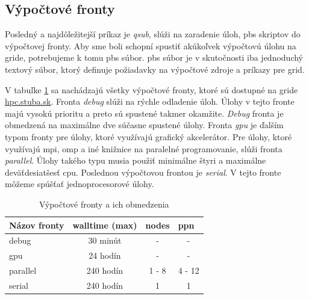 \subsection{Výpočtové fronty}
Posledný a najdôležitejší príkaz je \textit{qsub}, slúži na zaradenie úloh, \acrshort{pbs} skriptov do výpočtovej fronty.
Aby sme boli schopní spustiť akúkoľvek výpočtovú úlohu na gride, potrebujeme k tomu \acrfull{pbs} súbor.
\acrshort{pbs} súbor je v skutočnosti iba jednoduchý textový súbor, ktorý definuje požiadavky na výpočtové zdroje a príkazy pre grid.

V tabuľke \ref{tab:fronty} sa nachádzajú všetky výpočtové fronty, ktoré sú dostupné na gride \url{hpc.stuba.sk}.
Fronta \textit{debug} slúži na rýchle odladenie úloh. Úlohy v tejto fronte majú vysokú prioritu a preto sú spustené takmer okamžite.
\textit{Debug} fronta je obmedzená na maximálne dve súčasne spustené úlohy. Fronta \textit{gpu} je ďalším typom fronty pre úlohy, ktoré využívajú grafický akcelerátor.
Pre úlohy, ktoré využívajú \acrshort{mpi}, \acrshort{omp} a iné knižnice na paralelné programovanie, slúži fronta \textit{parallel}.
Úlohy takého typu musia použiť minimálne štyri a maximálne deväťdesiatšesť \acrshort{cpu}.
Poslednou výpočtovou frontou je \textit{serial}. V tejto fronte môžeme spúšťať jednoprocesorové úlohy. 

\begin{table}[!h]
\centering
\begin{tabular}{@{}lccc@{}}
\toprule
\textbf{Názov fronty} & \multicolumn{1}{l}{\textbf{walltime (max)}} & \multicolumn{1}{l}{\textbf{nodes}} & \multicolumn{1}{l}{\textbf{ppn}} \\ \midrule
debug                 & 30 minút                                    & -                                  & -                                      \\
gpu                   & 24 hodín                                    & -                                  & -                                      \\
parallel              & 240 hodín                                   & 1 - 8                              & 4 - 12                                 \\
serial                & 240 hodín                                   & 1                                  & 1                                      \\ \bottomrule
\end{tabular}
\caption{Výpočtové fronty a ich obmedzenia}
\label{tab:fronty}
\end{table}

